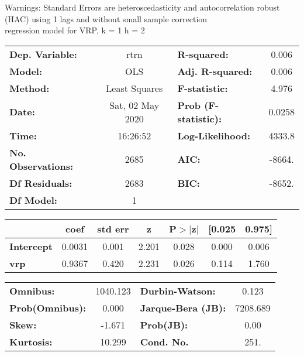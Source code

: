 Warnings: \newline
 [1] Standard Errors are heteroscedasticity and autocorrelation robust (HAC) using 1 lags and without small sample correction\\ 

regression model for VRP, k = 1 h = 2\begin{center}
\begin{tabular}{lclc}
\toprule
\textbf{Dep. Variable:}    &       rtrn       & \textbf{  R-squared:         } &     0.006   \\
\textbf{Model:}            &       OLS        & \textbf{  Adj. R-squared:    } &     0.006   \\
\textbf{Method:}           &  Least Squares   & \textbf{  F-statistic:       } &     4.976   \\
\textbf{Date:}             & Sat, 02 May 2020 & \textbf{  Prob (F-statistic):} &   0.0258    \\
\textbf{Time:}             &     16:26:52     & \textbf{  Log-Likelihood:    } &    4333.8   \\
\textbf{No. Observations:} &        2685      & \textbf{  AIC:               } &    -8664.   \\
\textbf{Df Residuals:}     &        2683      & \textbf{  BIC:               } &    -8652.   \\
\textbf{Df Model:}         &           1      & \textbf{                     } &             \\
\bottomrule
\end{tabular}
\begin{tabular}{lcccccc}
                   & \textbf{coef} & \textbf{std err} & \textbf{z} & \textbf{P$> |$z$|$} & \textbf{[0.025} & \textbf{0.975]}  \\
\midrule
\textbf{Intercept} &       0.0031  &        0.001     &     2.201  &         0.028        &        0.000    &        0.006     \\
\textbf{vrp}       &       0.9367  &        0.420     &     2.231  &         0.026        &        0.114    &        1.760     \\
\bottomrule
\end{tabular}
\begin{tabular}{lclc}
\textbf{Omnibus:}       & 1040.123 & \textbf{  Durbin-Watson:     } &    0.123  \\
\textbf{Prob(Omnibus):} &   0.000  & \textbf{  Jarque-Bera (JB):  } & 7208.689  \\
\textbf{Skew:}          &  -1.671  & \textbf{  Prob(JB):          } &     0.00  \\
\textbf{Kurtosis:}      &  10.299  & \textbf{  Cond. No.          } &     251.  \\
\bottomrule
\end{tabular}
\end{center}

